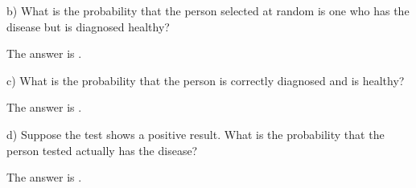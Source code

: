 \documentclass{ximera}
\begin{document}
\begin{question}
b) What is the probability that the person selected at random is one who has the disease but is diagnosed healthy?
     \begin{solution}
          The answer is .
      \end{solution}
\end{question}

\begin{question}
c) What is the probability that the person is correctly diagnosed and is healthy?
     \begin{solution}
          The answer is .
      \end{solution}
\end{question}

\begin{question}
d) Suppose the test shows a positive result. What is the probability that the person tested actually has the disease?
     \begin{solution}
          The answer is .
      \end{solution}
\end{question}
\end{document}
